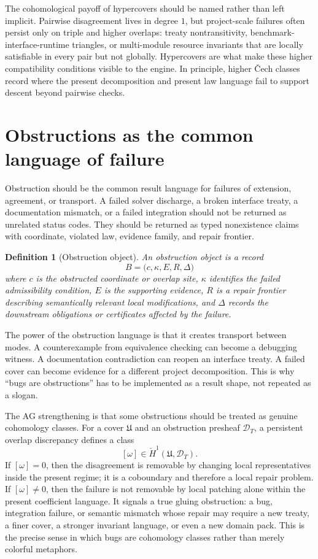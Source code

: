 \documentclass[11pt]{report}
\newtheorem{definition}{Definition}[chapter]
\begin{document}
The cohomological payoff of hypercovers should be named rather than left implicit. Pairwise disagreement lives in degree $1$, but project-scale failures often persist only on triple and higher overlaps: treaty nontransitivity, benchmark-interface-runtime triangles, or multi-module resource invariants that are locally satisfiable in every pair but not globally. Hypercovers are what make these higher compatibility conditions visible to the engine. In principle, higher \v{C}ech classes record where the present decomposition and present law language fail to support descent beyond pairwise checks.
\section{Obstructions as the common language of failure}
Obstruction should be the common result language for failures of extension, agreement, or transport. A failed solver discharge, a broken interface treaty, a documentation mismatch, or a failed integration should not be returned as unrelated status codes. They should be returned as typed nonexistence claims with coordinate, violated law, evidence family, and repair frontier.

\begin{definition}[Obstruction object]
An obstruction object is a record
\[
B=\bigl(c,\kappa,E,R,\Delta\bigr)
\]
where $c$ is the obstructed coordinate or overlap site, $\kappa$ identifies the failed admissibility condition, $E$ is the supporting evidence, $R$ is a repair frontier describing semantically relevant local modifications, and $\Delta$ records the downstream obligations or certificates affected by the failure.
\end{definition}

The power of the obstruction language is that it creates transport between modes. A counterexample from equivalence checking can become a debugging witness. A documentation contradiction can reopen an interface treaty. A failed cover can become evidence for a different project decomposition. This is why ``bugs are obstructions'' has to be implemented as a result shape, not repeated as a slogan.

The AG strengthening is that some obstructions should be treated as genuine cohomology classes. For a cover $\mathfrak{U}$ and an obstruction presheaf $\mathscr{D}_T$, a persistent overlap discrepancy defines a class
\[
[\omega] \in \check{H}^1(\mathfrak{U},\mathscr{D}_T).
\]
If $[\omega]=0$, then the disagreement is removable by changing local representatives inside the present regime; it is a coboundary and therefore a local repair problem. If $[\omega]\neq 0$, then the failure is not removable by local patching alone within the present coefficient language. It signals a true gluing obstruction: a bug, integration failure, or semantic mismatch whose repair may require a new treaty, a finer cover, a stronger invariant language, or even a new domain pack. This is the precise sense in which bugs are cohomology classes rather than merely colorful metaphors.
\end{document}

